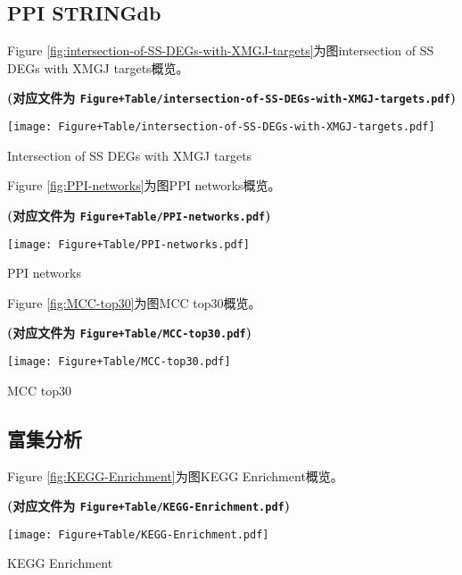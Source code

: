 \documentclass[
]{article}
\begin{document}
\hypertarget{ppi-stringdb}{%
\subsection{PPI STRINGdb}\label{ppi-stringdb}}

Figure \ref{fig:intersection-of-SS-DEGs-with-XMGJ-targets}为图intersection of SS DEGs with XMGJ targets概览。

\textbf{(对应文件为 \texttt{Figure+Table/intersection-of-SS-DEGs-with-XMGJ-targets.pdf})}

\def\@captype{figure}
\begin{center}
\texttt{[image: Figure+Table/intersection-of-SS-DEGs-with-XMGJ-targets.pdf]}
\caption{Intersection of SS DEGs with XMGJ targets}\label{fig:intersection-of-SS-DEGs-with-XMGJ-targets}
\end{center}

Figure \ref{fig:PPI-networks}为图PPI networks概览。

\textbf{(对应文件为 \texttt{Figure+Table/PPI-networks.pdf})}

\def\@captype{figure}
\begin{center}
\texttt{[image: Figure+Table/PPI-networks.pdf]}
\caption{PPI networks}\label{fig:PPI-networks}
\end{center}

Figure \ref{fig:MCC-top30}为图MCC top30概览。

\textbf{(对应文件为 \texttt{Figure+Table/MCC-top30.pdf})}

\def\@captype{figure}
\begin{center}
\texttt{[image: Figure+Table/MCC-top30.pdf]}
\caption{MCC top30}\label{fig:MCC-top30}
\end{center}

\hypertarget{ux5bccux96c6ux5206ux6790}{%
\subsection{富集分析}\label{ux5bccux96c6ux5206ux6790}}

Figure \ref{fig:KEGG-Enrichment}为图KEGG Enrichment概览。

\textbf{(对应文件为 \texttt{Figure+Table/KEGG-Enrichment.pdf})}

\def\@captype{figure}
\begin{center}
\texttt{[image: Figure+Table/KEGG-Enrichment.pdf]}
\caption{KEGG Enrichment}\label{fig:KEGG-Enrichment}
\end{center}
\end{document}
